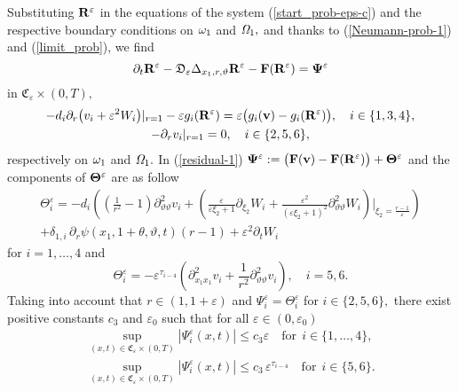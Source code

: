 \documentclass[reqno]{amsart}            %
\numberwithin{equation}{section}
\begin{document}
Substituting ${\bf R}^\varepsilon$ in the equations of the system (\ref{start_prob-eps-c}) and the respective boundary conditions on ${\it \omega}_1$
and ${\it \Omega}_1,$  and thanks to (\ref{Neumann-prob-1}) and (\ref{limit_prob}), we find
\begin{equation}\label{residual-1}
\partial_t {\bf R}^\varepsilon - \mathfrak{D}_\varepsilon \Delta_{x_1,r,\vartheta}{\bf R}^\varepsilon  -  {\bf F}({\bf R}^\varepsilon)=
 {\bf \Psi}^\varepsilon
\end{equation}
in $\mathfrak{C}_\varepsilon \times (0, T),$
\begin{gather}\label{bc-1}
  - d_i\partial_r \big(v_i + \varepsilon^2 W_i\big)|_{r=1} - \varepsilon g_i({\bf R}^\varepsilon) = \varepsilon \big( g_i({\bf v}) - g_i({\bf R}^\varepsilon)\big), \quad i\in \{1, 3, 4\},
  \\ \label{bc-2}
  - \partial_r v_i|_{r=1} = 0, \quad i\in \{2, 5, 6\},
\end{gather}
respectively on ${\it \omega}_1$ and ${\it \Omega}_1.$ In (\ref{residual-1})
${\bf \Psi}^\varepsilon:= \big({\bf F}({\bf v}) - {\bf F}({\bf R}^\varepsilon)\big) +  {\bf \Theta}^\varepsilon$
and  the components of ${\bf \Theta}^\varepsilon$ are as follow
\begin{gather*}
{\Theta}^\varepsilon_i = - d_i\left( \left(\frac{1}{r^2} - 1\right) \partial^2_{\vartheta \vartheta} {v}_i + \left(\frac{\varepsilon}{\varepsilon \xi_2 + 1} \partial_{\xi_2} {W}_i +
\frac{\varepsilon^2}{(\varepsilon \xi_2 + 1)^2} \partial^2_{\vartheta \vartheta} {W}_i
\right)\Big|_{\xi_2= \frac{r-1}{\varepsilon}}\right)
\\[2mm]
 +  \delta_{1,i}\,  \partial_{r}\psi(x_1,1+\theta,\vartheta,t)(r-1) + \varepsilon^2 \partial_t {W}_i
\end{gather*}
for $i=1,\ldots,4$ and
$$
{\Theta}^\varepsilon_i = -\varepsilon^{\tau_{i-4}} \left( \partial^2_{x_1 x_1} {v}_i + \frac{1}{r^2} \partial^2_{\vartheta \vartheta} {v}_i \right), \quad i=5, 6.
$$
Taking into account that $r\in (1, 1+ \varepsilon)$ and $\Psi^\varepsilon_i=\Theta^\varepsilon_i$ for $i\in \{2, 5, 6\},$ there exist positive constants $c_3$ and $\varepsilon_0$ such that for all $\varepsilon\in (0, \varepsilon_0)$
\begin{gather}\label{est-1}
\sup_{(x,t) \in \mathfrak{C}_\varepsilon \times (0, T)} \left| {\Psi}^\varepsilon_i(x,t) \right| \le c_3 \varepsilon \quad \text{for} \ \ i\in \{1,\ldots,4\},
\\
\sup_{(x,t) \in \mathfrak{C}_\varepsilon \times (0, T)} \left| {\Psi}^\varepsilon_i(x,t) \right| \le c_3 \, \varepsilon^{\tau_{i-4}} \quad \text{for} \ \ i\in \{5, 6\}. \label{est-2}
\end{gather}
\end{document}
